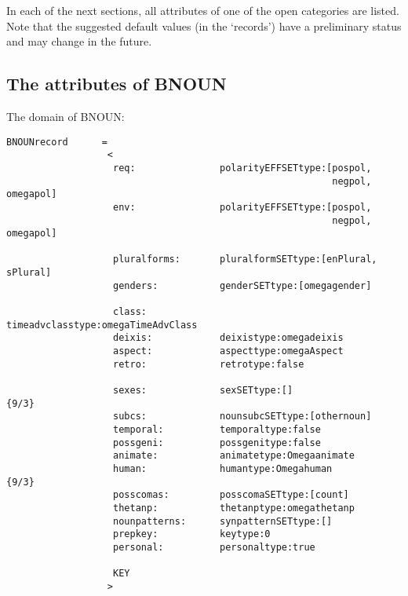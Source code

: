 In each of the next sections, all attributes of one of the open categories are 
listed. Note that the suggested default values (in the `records') 
have a preliminary status and may change in the future. 

\subsection{The attributes of BNOUN}

The domain of BNOUN:

\begin{verbatim}
BNOUNrecord      =
                  <
                   req:               polarityEFFSETtype:[pospol, 
                                                          negpol, omegapol]
                   env:               polarityEFFSETtype:[pospol, 
                                                          negpol, omegapol]

                   pluralforms:       pluralformSETtype:[enPlural, sPlural]
                   genders:           genderSETtype:[omegagender]  

                   class:             timeadvclasstype:omegaTimeAdvClass
                   deixis:            deixistype:omegadeixis
                   aspect:            aspecttype:omegaAspect
                   retro:             retrotype:false

                   sexes:             sexSETtype:[]                        {9/3}
                   subcs:             nounsubcSETtype:[othernoun]
                   temporal:          temporaltype:false
                   possgeni:          possgenitype:false
                   animate:           animatetype:Omegaanimate
                   human:             humantype:Omegahuman                 {9/3}
                   posscomas:         posscomaSETtype:[count]
                   thetanp:           thetanptype:omegathetanp
                   nounpatterns:      synpatternSETtype:[]
                   prepkey:           keytype:0
                   personal:          personaltype:true

                   KEY              
                  >
\end{verbatim}

